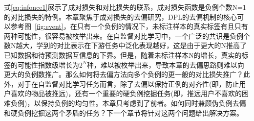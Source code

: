 式\eqref{eq:infonce1}展示了成对损失和对比损失的联系，成对损失函数是负例个数N=1的对比损失的特例。本章聚焦于成对损失的去偏研究，DPL的去偏机制的核心可以参考图~\ref{fig:event}，在只有一个负例的情况下，未标注样本的真实标签有且只有两种可能性，很容易被枚举出来。在自监督对比学习中，一个广泛的共识是负例个数N越大，学到的对比表示在下游任务中泛化表现越好\cite{Oord:2018:arxiv,Chuang:2020:NIPS,Robinson:2021:ICLR}，这是由于更大的N推高了已知数据和待预测数据互信息的下界\cite{Oord:2018:arxiv}。但是，随着未标注样本N的增长，真实的标签的可能性指数级增长为$2^N$种，难以被枚举出来，导致本章的去偏思路则难以向更大的负例数推广。那么如何将去偏方法向多个负例的更一般的对比损失推广？此外，对于在自监督对比学习任务而言，除了去偏以保持正例的对齐性(即，防止用户喜欢的物品被推远)，还有一个重要的硬负例挖掘任务(即，推远用户不喜欢的困难负例)，以保持负例的均匀性\cite{Wang:2020:ICML,Feng:2021:CVPR}。本章只考虑到了前者。如何同时兼顾伪负例去偏和硬负例挖掘这两个矛盾的任务？下一个章节将针对这两个问题给出解决方案。

